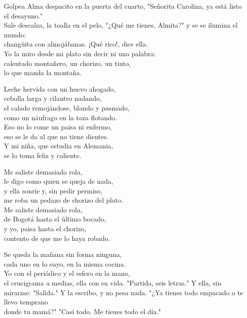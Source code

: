 \begin{lyrics}

Golpea Alma despacito en la puerta del cuarto,
"Señorita Carolina, ya está listo el desayuno."\\
Sale descalza, la toalla en el pelo,
"¿Qué me tienes, Almita?" y se se ilumina el mundo:\\
changüita con almojábanas. ¡Qué rico!, dice ella.\\
Yo la miro desde mi plato sin decir ni una palabra:\\
calentado montañero, un chorizo, un tinto,\\
lo que manda la montaña.

Leche hervida con un huevo ahogado,\\
cebolla larga y cilantro nadando,\\
el calado remojándose, blando y pasmado,\\
como un náufrago en la taza flotando.\\
Eso no lo come un paisa ni enfermo,\\
eso se le da al que no tiene dientes.\\
Y mi niña, que estudia en Alemania,\\
se lo toma feliz y caliente.

Me saliste demasiado rola,\\
le digo como quien se queja de nada,\\
y ella sonríe y, sin pedir permiso,\\
me roba un pedazo de chorizo del plato.\\
Me saliste demasiado rola,\\
de Bogotá hasta el último bocado,\\
y yo, paisa hasta el chorizo,\\
contento de que me lo haya robado.

Se queda la mañana sin forma ninguna,\\
cada uno en lo suyo, en la misma cocina.\\
Yo con el periódico y el esfero en la mano,\\
el crucigrama a medias, ella con su vida.
"Partida, seis letras." Y ella, sin mirarme:
"Salida." Y la escribo, y no pesa nada.
"¿Ya tienes todo empacado o te llevo temprano\\
donde tu mamá?" "Casi todo. Me tienes todo el día."


\end{lyrics}
